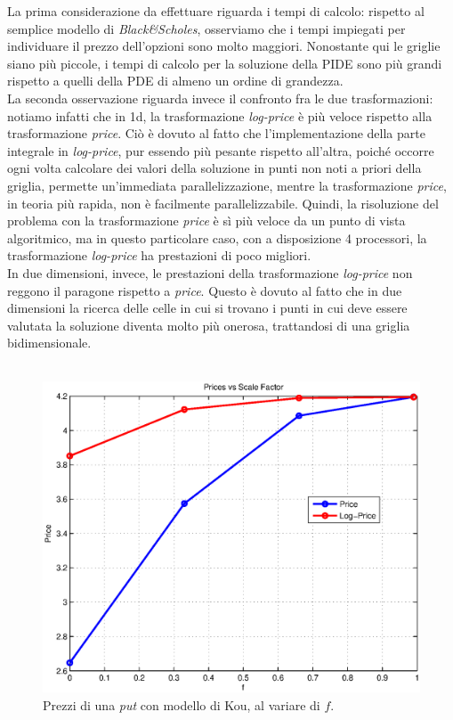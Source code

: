 \documentclass[a4paper,10pt]{report}
\theoremstyle{plain}
\theoremstyle{definition}
\theoremstyle{remark}
\begin{document}
La prima considerazione da effettuare riguarda i tempi di calcolo: rispetto al semplice modello di \emph{Black\&Scholes}, osserviamo che i tempi impiegati per individuare il prezzo dell'opzioni sono molto maggiori. Nonostante qui le griglie siano pi\`u piccole, i tempi di calcolo per la soluzione della PIDE sono pi\`u grandi rispetto a quelli della PDE di almeno un ordine di grandezza.\\La seconda osservazione riguarda invece il confronto fra le due trasformazioni: notiamo infatti che in 1d, la trasformazione \emph{log-price} \`e pi\`u veloce rispetto alla trasformazione \emph{price}. Ci\`o \`e dovuto al fatto che l'implementazione della parte integrale in \emph{log-price}, pur essendo pi\`u pesante rispetto all'altra, poich\'e occorre ogni volta calcolare dei valori della soluzione in punti non noti a priori della griglia, permette un'immediata parallelizzazione, mentre la trasformazione \emph{price}, in teoria pi\`u rapida, non \`e facilmente parallelizzabile. Quindi, la risoluzione del problema con la trasformazione \emph{price} \`e s\`i pi\`u veloce da un punto di vista algoritmico, ma in questo particolare caso, con a disposizione 4 processori, la trasformazione \emph{log-price} ha prestazioni di poco migliori.\\In due dimensioni, invece, le prestazioni della trasformazione \emph{log-price} non reggono il paragone rispetto a \emph{price}. Questo è dovuto al fatto che in due dimensioni la ricerca delle celle in cui si trovano i punti in cui deve essere valutata la soluzione diventa molto più onerosa, trattandosi di una griglia bidimensionale.\\\\
\begin{figure}[htp!]
\begin{center}
\includegraphics[width=12cm]{img/test2-scalefactor.eps}
\caption{Prezzi di una \emph{put} con modello di Kou, al variare di $f$.}
\label{fig:test2-scalefactor}
\end{center}
\end{figure}
\end{document}
